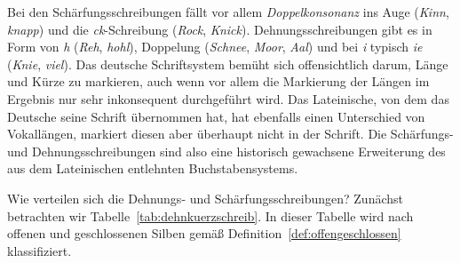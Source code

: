 Bei den Schärfungsschreibungen fällt vor allem \textit{Doppelkonsonanz} ins Auge (\textit{Kinn}, \textit{knapp}) und die \textit{ck}-Schreibung (\textit{Rock}, \textit{Knick}).
Dehnungsschreibungen gibt es in Form von \textit{h} (\textit{Reh}, \textit{hohl}), Doppelung (\textit{Schnee}, \textit{Moor}, \textit{Aal}) und bei \textit{i} typisch \textit{ie} (\textit{Knie}, \textit{viel}).
Das deutsche Schriftsystem bemüht sich offensichtlich darum, Länge und Kürze zu markieren, auch wenn vor allem die Markierung der Längen im Ergebnis nur sehr inkonsequent durchgeführt wird.
Das Lateinische, von dem das Deutsche seine Schrift übernommen hat, hat ebenfalls einen Unterschied von Vokallängen, markiert diesen aber überhaupt nicht in der Schrift.
Die Schärfungs- und Dehnungsschreibungen sind also eine historisch gewachsene Erweiterung des aus dem Lateinischen entlehnten Buchstabensystems.

Wie verteilen sich die Dehnungs- und Schärfungsschreibungen?
Zunächst betrachten wir Tabelle~\ref{tab:dehnkuerzschreib}.
In dieser Tabelle wird nach offenen und geschlossenen Silben gemäß Definition~\ref{def:offengeschlossen} klassifiziert.


